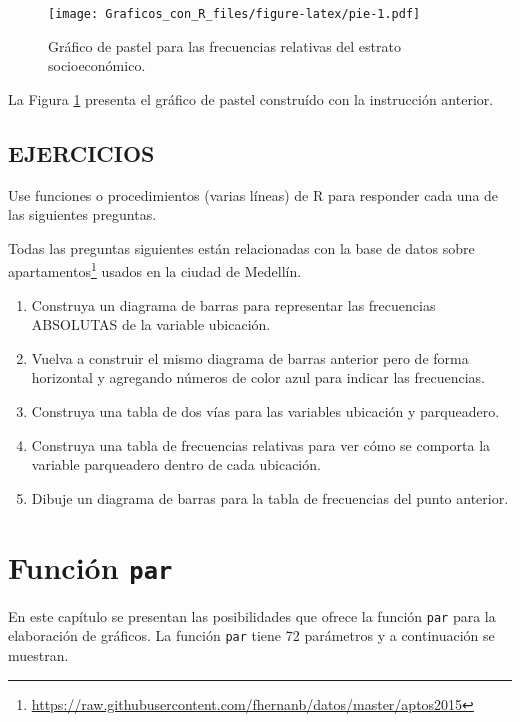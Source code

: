 \documentclass[10pt,]{krantz}
\providecommand{\tightlist}{%
  \setlength{\itemsep}{0pt}\setlength{\parskip}{0pt}}
\let\proglang=\textsf
\renewcommand{\href}[2]{#2\footnote{\url{#1}}}
\begin{document}
\begin{figure}[htbp]
\centering
\texttt{[image: Graficos\_con\_R\_files/figure-latex/pie-1.pdf]}
\caption{\label{fig:pie}Gráfico de pastel para las frecuencias relativas del
estrato socioeconómico.}
\end{figure}

La Figura \ref{fig:pie} presenta el gráfico de pastel construído con la
instrucción anterior.

\section*{EJERCICIOS}\label{ejercicios}


Use funciones o procedimientos (varias líneas) de \proglang{R} para
responder cada una de las siguientes preguntas.

Todas las preguntas siguientes están relacionadas con la base de datos
sobre
\href{https://raw.githubusercontent.com/fhernanb/datos/master/aptos2015}{apartamentos}
usados en la ciudad de Medellín.

\begin{enumerate}
\def\labelenumi{\arabic{enumi}.}
\tightlist
\item
  Construya un diagrama de barras para representar las frecuencias
  ABSOLUTAS de la variable ubicación.
\item
  Vuelva a construir el mismo diagrama de barras anterior pero de forma
  horizontal y agregando números de color azul para indicar las
  frecuencias.
\item
  Construya una tabla de dos vías para las variables ubicación y
  parqueadero.
\item
  Construya una tabla de frecuencias relativas para ver cómo se comporta
  la variable parqueadero dentro de cada ubicación.
\item
  Dibuje un diagrama de barras para la tabla de frecuencias del punto
  anterior.
\end{enumerate}

\chapter{\texorpdfstring{Función
\texttt{par}}{Función par}}\label{funcion-par}

En este capítulo se presentan las posibilidades que ofrece la función
\texttt{par} para la elaboración de gráficos. La función \texttt{par}
tiene 72 parámetros y a continuación se muestran.
\end{document}
